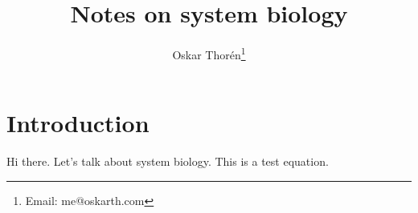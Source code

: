 \documentclass[12pt]{report}
\begin{document}
\title{Notes on system biology}
\author{Oskar Thor{\'e}n\thanks{Email: me@oskarth.com}}

\maketitle

\chapter{Introduction}

Hi there. Let's talk about system biology. This is a test equation.
\end{document}
